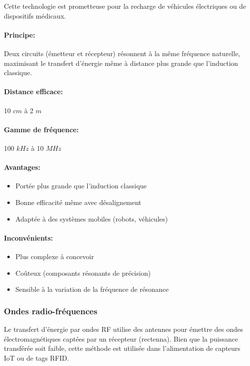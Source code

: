 \documentclass[12pt,a4paper,titlepage,notitlepage]{article}
\begin{document}
	Cette technologie est prometteuse pour la recharge de véhicules électriques ou de dispositifs médicaux.
	\paragraph{Principe: \\}
	Deux circuits (émetteur et récepteur) résonnent à la même fréquence naturelle, maximisant le transfert d’énergie même à distance plus grande que l’induction classique.
	\paragraph{Distance efficace: \\}
	10 $cm$ à 2 $m$
	\paragraph{Gamme de fréquence: \\}
	100 $kHz$ à 10 $MHz$
	\paragraph{Avantages: }
	\begin{itemize}
		\item Portée plus grande que l’induction classique
		\item Bonne efficacité même avec désalignement
		\item Adaptée à des systèmes mobiles (robots, véhicules)
	\end{itemize}
	\paragraph{Inconvénients: }
	\begin{itemize}
		\item Plus complexe à concevoir
		\item Coûteux (composants résonants de précision)
		\item Sensible à la variation de la fréquence de résonance
	\end{itemize}



	\subsubsection{Ondes radio-fréquences}
	Le transfert d’énergie par ondes RF utilise des antennes pour émettre des ondes électromagnétiques captées par un récepteur (rectenna). Bien que la puissance transférée soit faible, cette méthode est utilisée dans l’alimentation de capteurs IoT ou de tags RFID.
\end{document}
